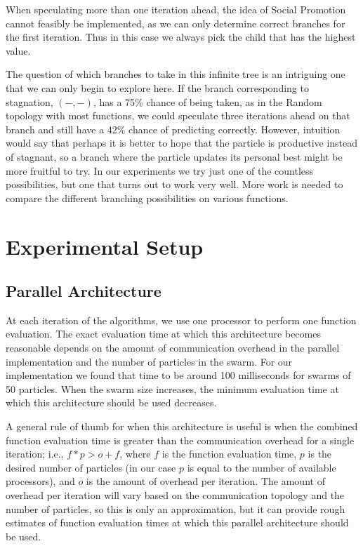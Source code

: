 \documentclass[smallcondensed]{svjour3}
\providecommand{\casepn}{\ensuremath{(-,-)}}
\begin{document}
When speculating more than one iteration ahead, the idea of Social Promotion
cannot feasibly be implemented, as we can only determine correct branches for
the first iteration.  Thus in this case we always pick the child that has the
highest value.

The question of which branches to take in this infinite tree is an intriguing
one that we can only begin to explore here.  If the branch corresponding to
stagnation, \casepn, has a 75\% chance of being taken, as in the Random
topology with most functions, we could speculate three iterations ahead on that
branch and still have a 42\% chance of predicting correctly.  However,
intuition would say that perhaps it is better to hope that the particle is
productive instead of stagnant, so a branch where the particle updates its
personal best might be more fruitful to try.  In our experiments we try just
one of the countless possibilities, but one that turns out to work very well.
More work is needed to compare the different branching possibilities on various
functions.

\section{Experimental Setup}
\label{sec:setup}

\subsection{Parallel Architecture}

At each iteration of the algorithms, we use one processor to perform one
function evaluation.  The exact evaluation time at which this architecture
becomes reasonable depends on the amount of communication overhead in the
parallel implementation and the number of particles in the swarm.  For our
implementation we found that time to be around 100 milliseconds for swarms of
50 particles.  When the swarm size increases, the minimum evaluation time at
which this architecture should be used decreases.

A general rule of thumb for when this architecture is useful is when the
combined function evaluation time is greater than the communication overhead
for a single iteration; i.e., $f*p > o+f$, where $f$ is the function evaluation
time, $p$ is the desired number of particles (in our case $p$ is equal to the
number of available processors), and $o$ is the amount of overhead per
iteration.  The amount of overhead per iteration will vary based on the
communication topology and the number of particles, so this is only an
approximation, but it can provide rough estimates of function evaluation times
at which this parallel architecture should be used.
\end{document}
